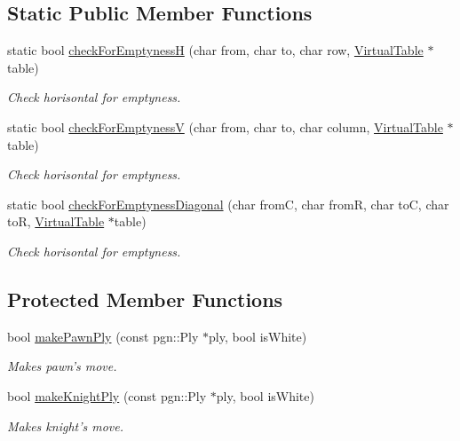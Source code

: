 \subsection*{Static Public Member Functions}
\begin{DoxyCompactItemize}
\item 
static bool \hyperlink{classChEngn_1_1Engine_aebba3d5fac90f1e829fc122b31f26064}{checkForEmptynessH} (char from, char to, char row, \hyperlink{classChEngn_1_1Table}{VirtualTable} $\ast$table)
\begin{DoxyCompactList}\small\item\em Check horisontal for emptyness. \item\end{DoxyCompactList}\item 
static bool \hyperlink{classChEngn_1_1Engine_ab812e459beb68c21e02370d0f7767299}{checkForEmptynessV} (char from, char to, char column, \hyperlink{classChEngn_1_1Table}{VirtualTable} $\ast$table)
\begin{DoxyCompactList}\small\item\em Check horisontal for emptyness. \item\end{DoxyCompactList}\item 
static bool \hyperlink{classChEngn_1_1Engine_afa008c74a0a46fc1dacd41ad2d8210e2}{checkForEmptynessDiagonal} (char fromC, char fromR, char toC, char toR, \hyperlink{classChEngn_1_1Table}{VirtualTable} $\ast$table)
\begin{DoxyCompactList}\small\item\em Check horisontal for emptyness. \item\end{DoxyCompactList}\end{DoxyCompactItemize}
\subsection*{Protected Member Functions}
\begin{DoxyCompactItemize}
\item 
bool \hyperlink{classChEngn_1_1Engine_a5ee94d0b489d05ef5e643cb9cfe5ac1a}{makePawnPly} (const pgn::Ply $\ast$ply, bool isWhite)
\begin{DoxyCompactList}\small\item\em Makes pawn's move. \item\end{DoxyCompactList}\item 
bool \hyperlink{classChEngn_1_1Engine_a1dc6130dd986b0b0b8960a3c1e99f87c}{makeKnightPly} (const pgn::Ply $\ast$ply, bool isWhite)
\begin{DoxyCompactList}\small\item\em Makes knight's move. \item\end{DoxyCompactList}\end{DoxyCompactItemize}
